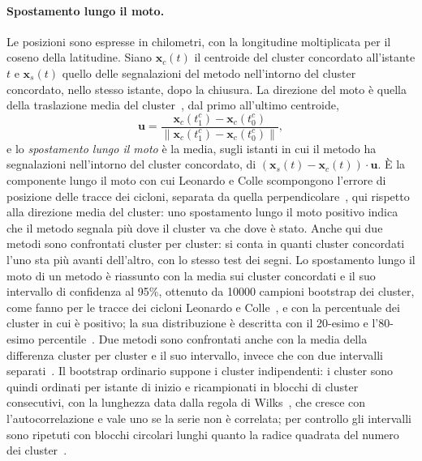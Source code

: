 \paragraph{Spostamento lungo il moto.} Le posizioni sono espresse in chilometri, con la longitudine moltiplicata per il coseno della latitudine. Siano $\mathbf{x}_c(t)$ il centroide del cluster concordato all'istante $t$ e $\mathbf{x}_s(t)$ quello delle segnalazioni del metodo nell'intorno del cluster concordato, nello stesso istante, dopo la chiusura. La direzione del moto è quella della traslazione media del cluster~\cite{davis2006objectb}, dal primo all'ultimo centroide,
\begin{equation}
\mathbf{u}=\frac{\mathbf{x}_c(t_1^c)-\mathbf{x}_c(t_0^c)}{\lVert\mathbf{x}_c(t_1^c)-\mathbf{x}_c(t_0^c)\rVert},
\end{equation}
e lo \emph{spostamento lungo il moto} è la media, sugli istanti in cui il metodo ha segnalazioni nell'intorno del cluster concordato, di $(\mathbf{x}_s(t)-\mathbf{x}_c(t))\cdot\mathbf{u}$. È la componente lungo il moto con cui Leonardo e Colle scompongono l'errore di posizione delle tracce dei cicloni, separata da quella perpendicolare~\cite{leonardo2020alongtrack}, qui rispetto alla direzione media del cluster: uno spostamento lungo il moto positivo indica che il metodo segnala più dove il cluster va che dove è stato. Anche qui due metodi sono confrontati cluster per cluster: si conta in quanti cluster concordati l'uno sta più avanti dell'altro, con lo stesso test dei segni. Lo spostamento lungo il moto di un metodo è riassunto con la media sui cluster concordati e il suo intervallo di confidenza al 95\%, ottenuto da 10000 campioni bootstrap dei cluster, come fanno per le tracce dei cicloni Leonardo e Colle~\cite{leonardo2017verification,leonardo2020alongtrack}, e con la percentuale dei cluster in cui è positivo; la sua distribuzione è descritta con il 20-esimo e l'80-esimo percentile~\cite{leonardo2017verification}. Due metodi sono confrontati anche con la media della differenza cluster per cluster e il suo intervallo, invece che con due intervalli separati~\cite{gilleland2018testing}. Il bootstrap ordinario suppone i cluster indipendenti: i cluster sono quindi ordinati per istante di inizio e ricampionati in blocchi di cluster consecutivi, con la lunghezza data dalla regola di Wilks~\cite{wilks1997resampling}, che cresce con l'autocorrelazione e vale uno se la serie non è correlata; per controllo gli intervalli sono ripetuti con blocchi circolari lunghi quanto la radice quadrata del numero dei cluster~\cite{gilleland2018testing}.

